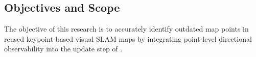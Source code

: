\subsection{Objectives and Scope}
\label{objectives}

The objective of this research is to accurately identify outdated map points in reused keypoint-based visual SLAM maps by integrating point-level directional observability into the update step of . 